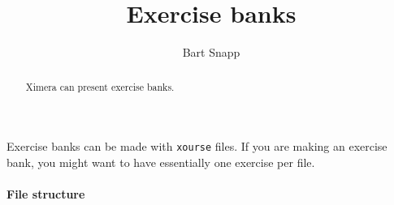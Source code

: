 \documentclass{ximera}
\title{Exercise banks}
\author{Bart Snapp}
\begin{document}
\begin{abstract}
  Ximera can present exercise banks.
\end{abstract}
\maketitle



Exercise banks can be made with \verb!xourse! files. If you are making an
exercise bank, you might want to have essentially one exercise per file.

\paragraph{File structure}
\end{document}

